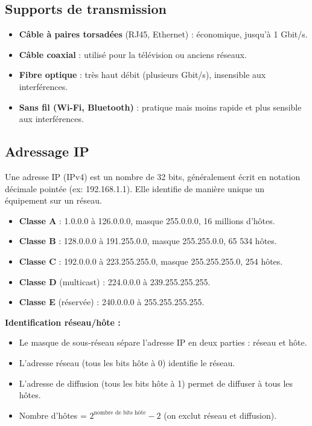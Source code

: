 \subsection{Supports de transmission}
\begin{definition}
\begin{itemize}
    \item \textbf{Câble à paires torsadées} (RJ45, Ethernet) : économique, jusqu'à 1 Gbit/s.
    \item \textbf{Câble coaxial} : utilisé pour la télévision ou anciens réseaux.
    \item \textbf{Fibre optique} : très haut débit (plusieurs Gbit/s), insensible aux interférences.
    \item \textbf{Sans fil (Wi-Fi, Bluetooth)} : pratique mais moins rapide et plus sensible aux interférences.
\end{itemize}
\end{definition}

\subsection{Adressage IP}
\begin{definition}[Adresse IP]
Une adresse IP (IPv4) est un nombre de 32 bits, généralement écrit en notation décimale pointée (ex: 192.168.1.1). Elle identifie de manière unique un équipement sur un réseau.
\end{definition}

\begin{propriete}
\begin{itemize}
    \item \textbf{Classe A} : 1.0.0.0 à 126.0.0.0, masque 255.0.0.0, 16 millions d'hôtes.
    \item \textbf{Classe B} : 128.0.0.0 à 191.255.0.0, masque 255.255.0.0, 65 534 hôtes.
    \item \textbf{Classe C} : 192.0.0.0 à 223.255.255.0, masque 255.255.255.0, 254 hôtes.
    \item \textbf{Classe D} (multicast) : 224.0.0.0 à 239.255.255.255.
    \item \textbf{Classe E} (réservée) : 240.0.0.0 à 255.255.255.255.
\end{itemize}
\end{propriete}

\begin{aretenir}
\textbf{Identification réseau/hôte :}
\begin{itemize}
    \item Le masque de sous-réseau sépare l'adresse IP en deux parties : réseau et hôte.
    \item L'adresse réseau (tous les bits hôte à 0) identifie le réseau.
    \item L'adresse de diffusion (tous les bits hôte à 1) permet de diffuser à tous les hôtes.
    \item Nombre d'hôtes = $2^{\text{nombre de bits hôte}} - 2$ (on exclut réseau et diffusion).
\end{itemize}
\end{aretenir}

